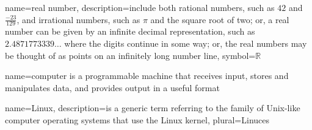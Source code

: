 {
  name={real number},
  description={include both rational numbers, such as $42$ and 
               $\frac{-23}{129}$, and irrational numbers, 
               such as $\pi$ and the square root of two; or,
               a real number can be given by an infinite decimal
               representation, such as $2.4871773339\ldots$ where
               the digits continue in some way; or, the real
               numbers may be thought of as points on an infinitely
               long number line},
  symbol={\ensuremath{\mathbb{R}}}
}

{
  name=computer
}
  {is a programmable machine that receives input,
               stores and manipulates data, and provides
               output in a useful format}

{
  name=Linux,
  description={is a generic term referring to the family of Unix-like
               computer operating systems that use the Linux kernel},
  plural=Linuces
}